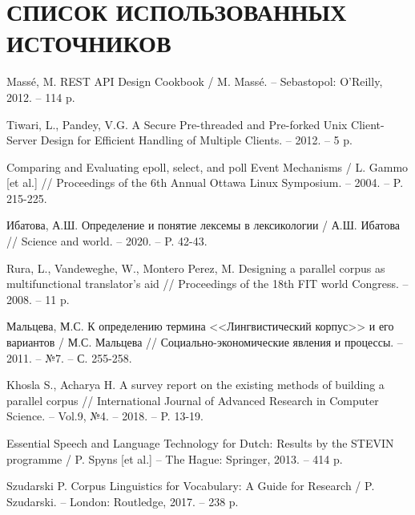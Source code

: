 \section*{СПИСОК ИСПОЛЬЗОВАННЫХ ИСТОЧНИКОВ}

\begingroup
\renewcommand{\section}[2]{}
\begin{thebibliography}{}
	Massé, M. REST API Design Cookbook / M. Massé. -- Sebastopol: O’Reilly, 2012. -- 114 p.
	
	Tiwari, L., Pandey, V.G. A Secure Pre-threaded and Pre-forked Unix Client-Server Design for Efficient Handling of Multiple Clients. -- 2012. -- 5 p. 
	
	Comparing and Evaluating epoll, select, and poll
	Event Mechanisms / L. Gammo [et al.] // Proceedings of the 6th Annual Ottawa Linux Symposium. -- 2004. -- P. 215-225.
	
	Ибатова, А.Ш. Определение и понятие лексемы в лексикологии / А.Ш. Ибатова // Science and world. -- 2020. -- P. 42-43.
	
	Rura, L., Vandeweghe, W., Montero Perez, M. Designing a parallel corpus as multifunctional translator's aid // Proceedings of the 18th FIT world Congress. -- 2008. -- 11 p.
	
	Мальцева, М.С. К определению термина <<Лингвистический корпус>> и его вариантов / М.С. Мальцева // Социально-экономические явления и процессы. -- 2011. -- №7. -- С. 255-258.
	
	Khosla S., Acharya H. A survey report on the existing methods of building a parallel corpus // International Journal of Advanced Research in Computer Science. -- Vol.9, №4. -- 2018. -- P. 13-19.
	
	Essential Speech and Language Technology for Dutch: Results by the STEVIN programme / P. Spyns [et al.] -- The Hague: Springer, 2013. -- 414 p.
	
	Szudarski P. Corpus Linguistics for Vocabulary: A Guide for Research / P. Szudarski. -- London: Routledge, 2017. -- 238 p.
	

\end{thebibliography}
